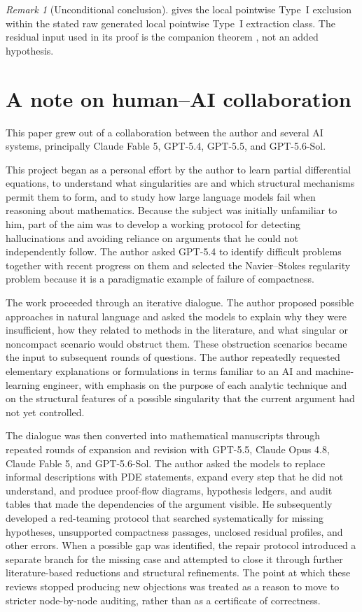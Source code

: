 \documentclass[11pt]{amsart}
\theoremstyle{plain}
\theoremstyle{definition}
\theoremstyle{remark}
\newtheorem{remark}[remark]{Remark}
\numberwithin{equation}{section}
\begin{document}
\begin{remark}[Unconditional conclusion]
 gives the local pointwise Type~I exclusion within
the stated raw generated local pointwise Type~I extraction class.  The
residual input used in its proof is the companion theorem
, not an added hypothesis.
\end{remark}

\clearpage
\section*{A note on human--AI collaboration}

This paper grew out of a collaboration between the author and several AI
systems, principally Claude Fable 5, GPT-5.4, GPT-5.5, and GPT-5.6-Sol.

This project began as a personal effort by the author to learn partial
differential equations, to understand what singularities are and which
structural mechanisms permit them to form, and to study how large language
models fail when reasoning about mathematics.  Because the subject was
initially unfamiliar to him, part of the aim was to develop a working protocol
for detecting hallucinations and avoiding reliance on arguments that he could
not independently follow.  The author asked GPT-5.4 to identify difficult
problems together with recent progress on them and selected the Navier--Stokes
regularity problem because it is a paradigmatic example of failure of
compactness.

The work proceeded through an iterative dialogue.  The author proposed
possible approaches in natural language and asked the models to explain why
they were insufficient, how they related to methods in the literature, and
what singular or noncompact scenario would obstruct them.  These obstruction
scenarios became the input to subsequent rounds of questions.  The author
repeatedly requested elementary explanations or formulations in terms familiar
to an AI and machine-learning engineer, with emphasis on the purpose of each
analytic technique and on the structural features of a possible singularity
that the current argument had not yet controlled.

The dialogue was then converted into mathematical manuscripts through repeated
rounds of expansion and revision with GPT-5.5, Claude Opus 4.8, Claude Fable 5,
and GPT-5.6-Sol.  The author asked the models to replace informal descriptions
with PDE statements, expand every step that he did not understand, and produce
proof-flow diagrams, hypothesis ledgers, and audit tables that made the
dependencies of the argument visible.  He subsequently developed a
red-teaming protocol that searched systematically for missing hypotheses,
unsupported compactness passages, unclosed residual profiles, and other errors.
When a possible gap was identified, the repair protocol introduced a separate
branch for the missing case and attempted to close it through further
literature-based reductions and structural refinements.  The point at which
these reviews stopped producing new objections was treated as a reason to move
to stricter node-by-node auditing, rather than as a certificate of correctness.
\end{document}
